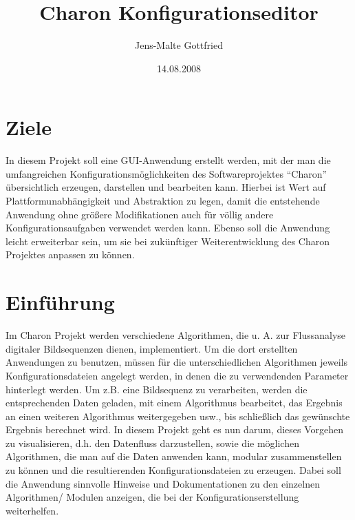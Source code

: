 \documentclass[a4paper, 11pt, fleqn, pointlessnumbers]{scrartcl}
\begin{document}
  \titlehead{
    Universität Heidelberg \hfill SoSem 2008\\
    Heidelberg Collaboratory for Image Processing (HCI)\\
    Speyerer Straße 4\\
    D-69115 Heidelberg
  }
  \subject{Projektpraktikum Informatik}
  \title{Charon Konfigurationseditor}
  \author{Jens-Malte Gottfried}
  \date{14.08.2008}
  \publishers{\vspace{1cm}Betreut durch Prof. Dr. B. Jähne}
  \maketitle

  \tableofcontents
  \pagebreak

  \section{Ziele}
  In diesem Projekt soll eine GUI-Anwendung erstellt werden, mit der
  man die umfangreichen Konfigurationsmöglichkeiten des Softwareprojektes
  "`Charon"' übersichtlich erzeugen, darstellen und bearbeiten kann.
  Hierbei ist Wert auf Plattformunabhängigkeit und Abstraktion zu legen,
  damit die entstehende Anwendung ohne größere Modifikationen auch für
  völlig andere Konfigurationsaufgaben verwendet werden kann. Ebenso soll
  die Anwendung leicht erweiterbar sein, um sie bei zukünftiger
  Weiterentwicklung des Charon Projektes anpassen zu können.

  \section{Einführung}
  Im Charon Projekt werden verschiedene Algorithmen, die u. A. zur
  Flussanalyse digitaler Bildsequenzen dienen, implementiert. Um die dort
  erstellten Anwendungen zu benutzen, müssen für die unterschiedlichen
  Algorithmen jeweils Konfigurationsdateien angelegt werden, in denen die zu
  verwendenden Parameter hinterlegt werden. Um z.B. eine Bildsequenz zu
  verarbeiten, werden die entsprechenden Daten geladen, mit einem Algorithmus
  bearbeitet, das Ergebnis an einen weiteren Algorithmus weitergegeben usw., bis
  schließlich das gewünschte Ergebnis berechnet wird. In diesem Projekt
  geht es nun darum, dieses Vorgehen zu visualisieren, d.h. den Datenfluss
  darzustellen, sowie die möglichen Algorithmen, die man auf die Daten
  anwenden kann, modular zusammenstellen zu können und die
  resultierenden Konfigurationsdateien zu erzeugen. Dabei soll die Anwendung
  sinnvolle Hinweise und Dokumentationen zu den einzelnen Algorithmen/
  Modulen anzeigen, die bei der Konfigurationserstellung weiterhelfen.
\end{document}
